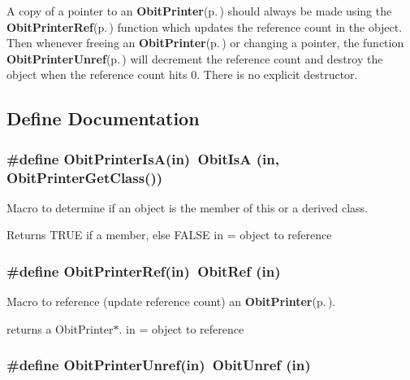 A copy of a pointer to an {\bf Obit\-Printer}{\rm (p.\,\pageref{structObitPrinter})} should always be made using the {\bf Obit\-Printer\-Ref}{\rm (p.\,\pageref{ObitPrinter_8h_a1})} function which updates the reference count in the object. Then whenever freeing an {\bf Obit\-Printer}{\rm (p.\,\pageref{structObitPrinter})} or changing a pointer, the function {\bf Obit\-Printer\-Unref}{\rm (p.\,\pageref{ObitPrinter_8h_a0})} will decrement the reference count and destroy the object when the reference count hits 0. There is no explicit destructor.

\subsection{Define Documentation}
\subsubsection{\setlength{\rightskip}{0pt plus 5cm}\#define Obit\-Printer\-Is\-A(in)\ Obit\-Is\-A (in, Obit\-Printer\-Get\-Class())}\label{ObitPrinter_8h_a2}


Macro to determine if an object is the member of this or a derived class. 

Returns TRUE if a member, else FALSE in = object to reference 
\subsubsection{\setlength{\rightskip}{0pt plus 5cm}\#define Obit\-Printer\-Ref(in)\ Obit\-Ref (in)}\label{ObitPrinter_8h_a1}


Macro to reference (update reference count) an {\bf Obit\-Printer}{\rm (p.\,\pageref{structObitPrinter})}. 

returns a Obit\-Printer$\ast$. in = object to reference 
\subsubsection{\setlength{\rightskip}{0pt plus 5cm}\#define Obit\-Printer\-Unref(in)\ Obit\-Unref (in)}\label{ObitPrinter_8h_a0}


